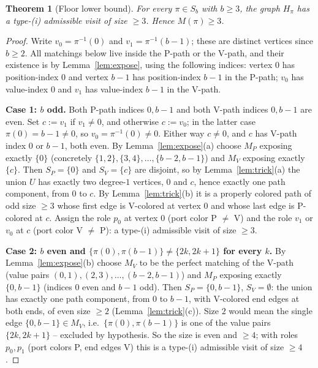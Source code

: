 \documentclass[11pt]{article}
\newtheorem{theorem}{Theorem}[section]
\theoremstyle{definition}
\newcommand{\inv}[1]{#1^{-1}}
\begin{document}
\begin{theorem}[Floor lower bound]\label{thm:floor-lower}
For every $\pi \in S_b$ with $b \ge 3$, the graph $H_\pi$ has a type-(i) admissible
visit of size $\ge 3$. Hence $M(\pi) \ge 3$.
\end{theorem}

\begin{proof}
Write $v_0 = \inv\pi(0)$ and $v_1 = \inv\pi(b-1)$; these are distinct vertices since
$b \ge 2$. All matchings below live inside the P-path or the V-path, and their
existence is by Lemma~\ref{lem:expose}, using the following indices: vertex $0$ has
position-index $0$ and vertex $b-1$ has position-index $b-1$ in the P-path; $v_0$ has
value-index $0$ and $v_1$ has value-index $b-1$ in the V-path.

\medskip
\noindent\textbf{Case 1: $b$ odd.}
Both P-path indices $0, b-1$ and both V-path indices $0, b-1$ are even. Set
$c := v_1$ if $v_1 \ne 0$, and otherwise $c := v_0$; in the latter case
$\pi(0) = b-1 \ne 0$, so $v_0 = \inv\pi(0) \ne 0$. Either way $c \ne 0$, and $c$ has
V-path index $0$ or $b-1$, both even. By Lemma~\ref{lem:expose}(a) choose $M_P$
exposing exactly $\{0\}$ (concretely $\{1,2\},\{3,4\},\dots,\{b-2,b-1\}$) and $M_V$
exposing exactly $\{c\}$. Then $S_P = \{0\}$ and $S_V = \{c\}$ are disjoint, so by
Lemma~\ref{lem:trick}(a) the union $U$ has exactly two degree-$1$ vertices, $0$ and
$c$, hence exactly one path component, from $0$ to $c$. By Lemma~\ref{lem:trick}(b) it
is a properly colored path of odd size $\ge 3$ whose first edge is V-colored at vertex
$0$ and whose last edge is P-colored at $c$. Assign the role $p_0$ at vertex $0$ (port
color P $\ne$ V) and the role $v_1$ or $v_0$ at $c$ (port color V $\ne$ P): a type-(i)
admissible visit of size $\ge 3$.

\medskip
\noindent\textbf{Case 2: $b$ even and $\{\pi(0), \pi(b-1)\} \ne \{2k, 2k+1\}$ for
every $k$.}
By Lemma~\ref{lem:expose}(b) choose $M_V$ to be the perfect matching of the V-path
(value pairs $(0,1), (2,3), \dots, (b-2,b-1)$) and $M_P$ exposing exactly
$\{0, b-1\}$ (indices $0$ even and $b-1$ odd). Then $S_P = \{0, b-1\}$, $S_V =
\emptyset$: the union has exactly one path component, from $0$ to $b-1$, with V-colored
end edges at both ends, of even size $\ge 2$ (Lemma~\ref{lem:trick}(c)). Size $2$ would
mean the single edge $\{0, b-1\} \in M_V$, i.e.\ $\{\pi(0), \pi(b-1)\}$ is one of the
value pairs $\{2k, 2k+1\}$ -- excluded by hypothesis. So the size is even and
$\ge 4$; with roles $p_0, p_1$ (port colors P, end edges V) this is a type-(i)
admissible visit of size $\ge 4$.


\end{proof}
\end{document}
